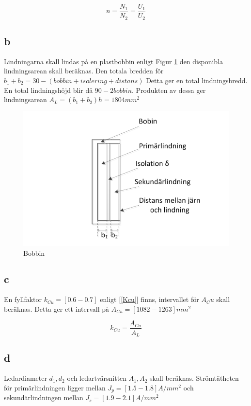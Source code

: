 \documentclass{article}
\begin{document}
\begin{equation}
  n=\frac{N_1}{N_2}=\frac{U_1}{U_2}
  \label{n}
\end{equation}

\subsection{b}
Lindningarna skall lindas på en plastbobbin enligt Figur \ref{fig:bobbin} den disponibla lindningsarean skall beräknas.
Den totala bredden för $b_1+b_2=30-(bobbin+isolering+distans)$ Detta ger en total lindningsbredd.
En total lindningshöjd blir då $90-2bobbin$.
Produkten av dessa ger lindningsarean $A_L=(b_1+b_2)h=1804 mm^2$

 \begin{figure}[H]
 \begin{center}
 \includegraphics[width=1\textwidth]{img/bobbin.png} %
 \caption{Bobbin}
 \label{fig:bobbin}
 \end{center}
 \end{figure}


\subsection{c}
En fyllfaktor $k_{Cu}=[0.6 - 0.7]$ enligt [\ref{Kcu}]  finns, intervallet för $A_Cu$ skall beräknas.
Detta ger ett intervall på $A_{Cu}=[1082 - 1263] mm^2$


\begin{equation}
  k_{Cu}=\frac{A_{Cu}}{A_L}
  \label{Kcu}
\end{equation}

\subsection{d}
Ledardiameter $d_1,d_2$ och ledartvärsnitten $A_1,A_2$ skall beräknas.
Strömtätheten för primärlindningen ligger mellan $J_p=[1.5 - 1.8] A/mm^2$ och sekundärlindningen mellan $J_s=[1.9 - 2.1] A/mm^2$
\end{document}
